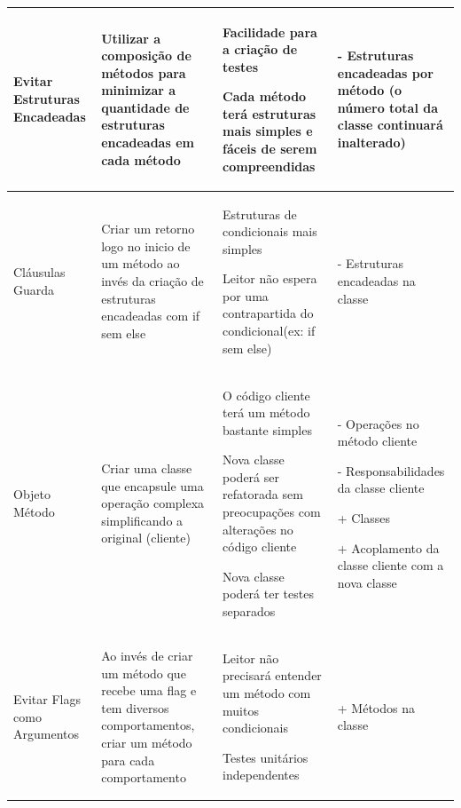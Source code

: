 \begin{landscape}
\begin{table}[hbt]
\begin{tabular}{|p{3.5cm}|p{5cm}|p{8.5cm}|p{7.2cm}|}
\hline 
Evitar Estruturas Encadeadas
& Utilizar a composição de métodos para minimizar a quantidade de estruturas encadeadas em cada método
& \begin{my_itemize}
	\item Facilidade para a criação de testes
	\item Cada método terá estruturas mais simples e fáceis de serem compreendidas
  \end{my_itemize}
& \begin{my_itemize}
	\item[-] Estruturas encadeadas por método (o número total da classe continuará inalterado)
  \end{my_itemize}
\tabularnewline

\hline 
Cláusulas Guarda
& Criar um retorno logo no inicio de um método ao invés da criação de estruturas encadeadas com if sem else
& \begin{my_itemize}
	\item Estruturas de condicionais mais simples
	\item Leitor não espera por uma contrapartida do condicional(ex: if sem else)
  \end{my_itemize}
& \begin{my_itemize}
	\item[-] Estruturas encadeadas na classe
  \end{my_itemize}
\tabularnewline

\hline
Objeto Método
& Criar uma classe que encapsule uma operação complexa simplificando a original (cliente)
& \begin{my_itemize}
	\item O código cliente terá um método bastante simples
	\item Nova classe poderá ser refatorada sem preocupações com alterações no código cliente
	\item Nova classe poderá ter testes separados
  \end{my_itemize}
& \begin{my_itemize}
	\item[-] Operações no método cliente
	\item[-] Responsabilidades da classe cliente
	\item[+] Classes
	\item[+] Acoplamento da classe cliente com a nova classe
  \end{my_itemize}
\tabularnewline

\hline
Evitar Flags como Argumentos
& Ao invés de criar um método que recebe uma flag e tem diversos comportamentos, criar  um  método para cada comportamento
& \begin{my_itemize}
	\item Leitor não precisará entender um método com muitos condicionais
	\item Testes unitários independentes
  \end{my_itemize}
& \begin{my_itemize}
	\item[+] Métodos na classe
  \end{my_itemize}
\tabularnewline


\end{tabular}
\end{table}
\end{landscape}
